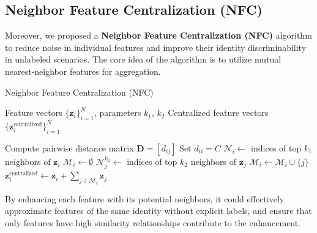\subsection{Neighbor Feature Centralization (NFC)}

Moreover, we proposed a \textbf{Neighbor Feature Centralization (NFC)} algorithm to reduce noise in individual features and improve their identity discriminability in unlabeled scenarios. The core idea of the algorithm is to utilize mutual nearest-neighbor features for aggregation. 
\begin{algorithm}[H]
\caption{Neighbor Feature Centralization (NFC)}
\label{alg:feature_enhancement}
\begin{algorithmic}[1] 
\Require Feature vectors \(\{\mathbf{z}_i\}_{i=1}^N\), parameters \(k_1\), \(k_2\)
\Ensure Centralized feature vectors \(\{\mathbf{z}_i^{\text{centralized}}\}_{i=1}^N\)

\State Compute pairwise distance matrix \(\mathbf{D} = [d_{ij}]\)
    \State Set \(d_{ii} = C\) 
\EndFor
{}
    \State \(\mathcal{N}_{i} \gets\) indices of top \(k_1\) neighbors of \(\mathbf{z}_i\)
\EndFor
{}
    \State \(\mathcal{M}_{i} \gets \emptyset\)
        \State \(\mathcal{N}_{j}^{k_2} \gets\) indices of top \(k_2\) neighbors of \(\mathbf{z}_j\)
            \State \(\mathcal{M}_{i} \gets \mathcal{M}_{i} \cup \{ j \}\)
        \EndIf
    \EndFor
\EndFor
{}
    \State \(\mathbf{z}_i^{\text{centralized}} \gets \mathbf{z}_i + \sum_{j \in \mathcal{M}_{i}} \mathbf{z}_j\)
\EndFor
\end{algorithmic}
\end{algorithm}
By enhancing each feature with its potential neighbors, it could effectively approximate features of the same identity without explicit labels, and ensure that only features have high similarity relationships contribute to the enhancement.






